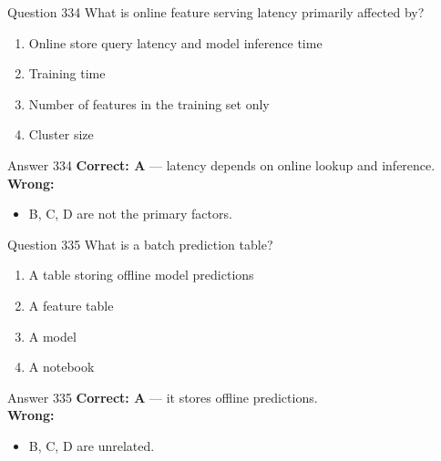 \documentclass[aspectratio=169,11pt]{beamer}
\begin{document}
	\begin{frame}{Question 334}
		What is online feature serving latency primarily affected by?
		\begin{enumerate}[label=\Alph*.]
			\item Online store query latency and model inference time
			\item Training time
			\item Number of features in the training set only
			\item Cluster size
		\end{enumerate}
	\end{frame}
	\begin{frame}{Answer 334}
		\textbf{Correct: A} --- latency depends on online lookup and inference.\\
		\vspace{0.5em}
		\textbf{Wrong:}
		\begin{itemize}
			\item B, C, D are not the primary factors.
		\end{itemize}
	\end{frame}
	
	\begin{frame}{Question 335}
		What is a batch prediction table?
		\begin{enumerate}[label=\Alph*.]
			\item A table storing offline model predictions
			\item A feature table
			\item A model
			\item A notebook
		\end{enumerate}
	\end{frame}
	\begin{frame}{Answer 335}
		\textbf{Correct: A} --- it stores offline predictions.\\
		\vspace{0.5em}
		\textbf{Wrong:}
		\begin{itemize}
			\item B, C, D are unrelated.
		\end{itemize}
	\end{frame}
	
\end{document}
